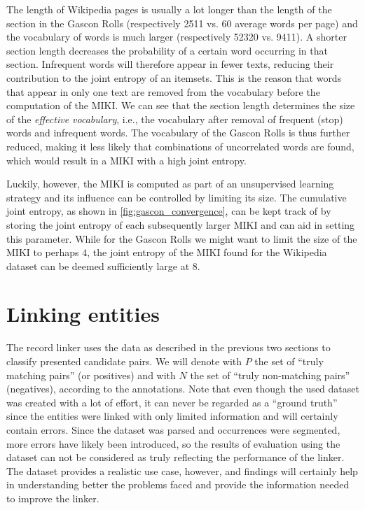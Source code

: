 The length of Wikipedia pages is usually a lot longer than the length of the section in the Gascon Rolls (respectively \num{2511} vs. \num{60} average words per page) and the vocabulary of words is much larger (respectively \num{52320} vs. \num{9411}).
A shorter section length decreases the probability of a certain word occurring in that section.
Infrequent words will therefore appear in fewer texts, reducing their contribution to the joint entropy of an itemsets.
This is the reason that words that appear in only one text are removed from the vocabulary before the computation of the MIKI.
We can see that the section length determines the size of the \emph{effective vocabulary}, i.e., the vocabulary after removal of frequent (stop) words and infrequent words.
The vocabulary of the Gascon Rolls is thus further reduced, making it less likely that combinations of uncorrelated words are found, which would result in a MIKI with a high joint entropy.

Luckily, however, the MIKI is computed as part of an unsupervised learning strategy and its influence can be controlled by limiting its size.
The cumulative joint entropy, as shown in \cref{fig:gascon_convergence}, can be kept track of by storing the joint entropy of each subsequently larger MIKI and can aid in setting this parameter.
While for the Gascon Rolls we might want to limit the size of the MIKI to perhaps $4$, the joint entropy of the MIKI found for the Wikipedia dataset can be deemed sufficiently large at $8$.




\section{Linking entities}
\label{sec:linking_entities}

The record linker uses the data as described in the previous two sections to classify presented candidate pairs.
We will denote with $P$ the set of ``truly matching pairs'' (or positives) and with $N$ the set of ``truly non-matching pairs'' (negatives), according to the annotations.
Note that even though the used dataset was created with a lot of effort, it can never be regarded as a ``ground truth'' since the entities were linked with only limited information and will certainly contain errors.
Since the dataset was parsed and occurrences were segmented, more errors have likely been introduced, so the results of evaluation using the dataset can not be considered as truly reflecting the performance of the linker.
The dataset provides a realistic use case, however, and findings will certainly help in understanding better the problems faced and provide the information needed to improve the linker.

